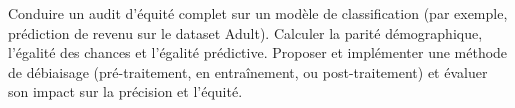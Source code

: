 \begin{exercice}
Conduire un audit d'\'equit\'e complet sur un mod\`ele de classification (par exemple, pr\'ediction de revenu sur le dataset Adult). Calculer la parit\'e d\'emographique, l'\'egalit\'e des chances et l'\'egalit\'e pr\'edictive. Proposer et impl\'ementer une m\'ethode de d\'ebiaisage (pr\'e-traitement, en entra\^inement, ou post-traitement) et \'evaluer son impact sur la pr\'ecision et l'\'equit\'e.
\end{exercice}
